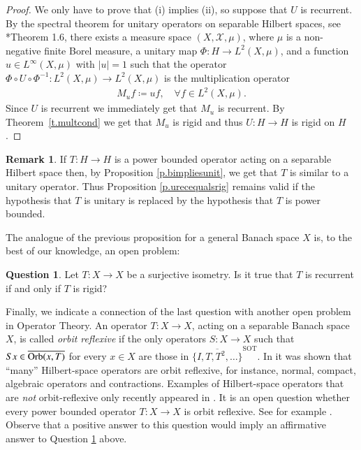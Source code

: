 \documentclass[12pt,leqno]{amsart}
\theoremstyle{plain}
\theoremstyle{definition}
\newtheorem{remark}[equation]{Remark}
\newtheorem{question}[equation]{Question}
\numberwithin{equation}{section}
\begin{document}
\begin{proof}
	We only have to prove that (i) implies (ii), so suppose that $U$ is recurrent. By the spectral theorem for unitary operators on separable Hilbert spaces, see \cite{RaRo}*{Theorem 1.6}, there exists a measure space $(X,\mathcal X,\mu)$, where $\mu$ is a non-negative finite Borel measure, a unitary map $\Phi:H\to L^2(X,\mu)$, and a function $u\in L^\infty(X,\mu)$ with $|u|=1$ such that the operator $\Phi\circ U\circ \Phi^{-1}:L^2(X,\mu)\to L^2(X,\mu)$ is the multiplication operator
\begin{align*}
 M_u f \coloneqq u f, \quad \forall f\in L^2(X,\mu).
\end{align*}
Since $U$ is recurrent we immediately get that $M_u$ is recurrent. By Theorem~\ref{t.multcond} we get that $M_u$ is rigid and thus $U:H\to H$ is rigid on $H$. \end{proof}

\begin{remark}
	If $T:H \to H$ is a power bounded operator acting on a separable Hilbert space then, by Proposition \ref{p.bimpliesunit}, we get that $T$ is similar to a unitary operator. Thus Proposition \ref{p.urecequalsrig} remains valid if the hypothesis that $T$ is unitary is replaced by the hypothesis that $T$ is power bounded.
\end{remark}

The analogue of the previous proposition for a general Banach space $X$ is, to the best of our knowledge, an open problem:

\begin{question}
	\label{q.suriso} Let $T:X\to X$ be a surjective isometry. Is it true that $T$ is recurrent if and only if $T$ is rigid? 
\end{question}

Finally, we indicate a connection of the last question with another open problem in Operator Theory. An operator $T:X\to X$, acting on a separable Banach space $X$, is called \emph{orbit reflexive} if the only operators $S:X\to X$ such that $Sx\in \overline{{\textnormal{Orb}}(x,T)}$ for every $x\in X$ are those in $\overline{\{I,T,T^2,\ldots\}} ^{\operatorname{SOT}}$. In \cite{HNRR} it was shown that ``many'' Hilbert-space operators are orbit reflexive, for instance, normal, compact, algebraic operators and contractions. Examples of Hilbert-space operators that are \emph{not} orbit-reflexive only recently appeared in \cites{GrivRog,MV}. It is an open question whether every power bounded operator $T:X\to X$ is orbit reflexive. See for example \cite{HIH}. Observe that a positive answer to this question would imply an affirmative answer to Question \ref{q.suriso} above.
\end{document}
